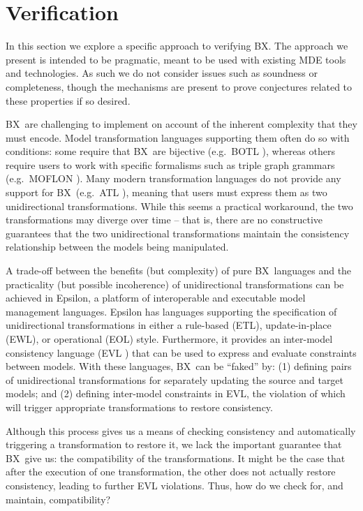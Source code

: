 \section{Verification}
\label{section:verification}

\newcommand{\BX}{BX}

In this section we explore a specific approach to verifying BX. The approach we present is intended to be pragmatic, meant to be used with existing MDE tools and technologies. As such we do not consider issues such as soundness or completeness, though the mechanisms are present to prove conjectures related to these properties if so desired.

\BX\ are challenging to implement on account of the inherent complexity that they must encode. Model transformation languages supporting them often do so with conditions: some require that \BX\ are bijective (e.g.\ BOTL \cite{Braun-Marschall03a}), whereas others require users to work with specific formalisms such as triple graph grammars (e.g.\ MOFLON \cite{AKRS06a}).  Many modern transformation languages do not provide any support for \BX\ (e.g.\ ATL \cite{JABK08a}), meaning that users must express them as two unidirectional transformations. While this seems a practical workaround, the two transformations may diverge over time -- that is, there are no constructive guarantees that the two unidirectional transformations maintain the consistency relationship between the models being manipulated.
	
A trade-off between the benefits (but complexity) of pure \BX\ languages and the practicality (but possible incoherence) of unidirectional transformations can be achieved in Epsilon, a platform of interoperable and executable model management languages. Epsilon has languages supporting the specification of unidirectional transformations in either a rule-based (ETL), update-in-place (EWL), or operational (EOL) \cite{Paige-KRDP09a} style. Furthermore, it provides an inter-model consistency language (EVL \cite{Kolovos-Paige-Polack09a}) that can be used to express and evaluate constraints between models. With these languages, \BX\ can be ``faked'' by: (1) defining pairs of unidirectional transformations for separately updating the source and target models; and (2) defining inter-model constraints in EVL, the violation of which will trigger appropriate transformations to restore consistency.
	
Although this process gives us a means of checking consistency and automatically triggering a transformation to restore it, we lack the important guarantee that \BX\ give us: the compatibility of the transformations. It might be the case that after the execution of one transformation, the other does not actually restore consistency, leading to further EVL violations. Thus, how do we check for, and maintain, compatibility? 
	
